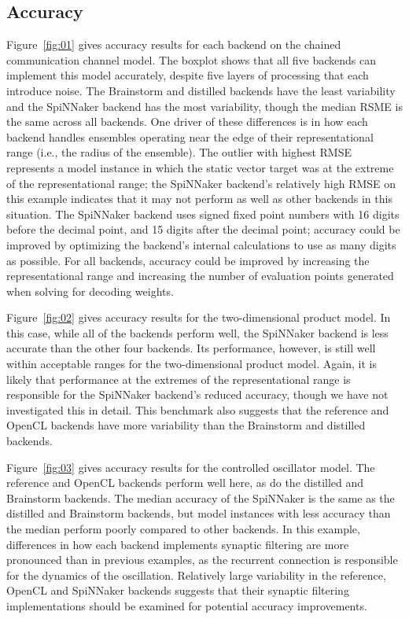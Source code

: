 \documentclass{frontiersSCNS}
\begin{document}
\subsection{Accuracy}

Figure~\ref{fig:01} gives accuracy results
for each backend on the chained communication channel model.
The boxplot shows that all five backends can
implement this model accurately,
despite five layers of processing
that each introduce noise.
The Brainstorm and distilled backends
have the least variability
and the SpiNNaker backend has the most variability,
though the median RSME is the same across all backends.
One driver of these differences
is in how each backend handles
ensembles operating near the edge
of their representational range
(i.e., the radius of the ensemble).
The outlier with highest RMSE represents
a model instance in which the static vector target
was at the extreme of the representational range;
the SpiNNaker backend's relatively high RMSE
on this example indicates that it
may not perform as well as other backends
in this situation.
The SpiNNaker backend uses
signed fixed point numbers
with 16 digits before the decimal point,
and 15 digits after the decimal point;
accuracy could be improved
by optimizing the backend's
internal calculations to use as
many digits as possible.
For all backends, accuracy could be improved
by increasing the representational range
and increasing the number of evaluation points generated
when solving for decoding weights.

Figure~\ref{fig:02} gives accuracy results
for the two-dimensional product model.
In this case, while all of the backends
perform well, the SpiNNaker backend
is less accurate than the other four backends.
Its performance, however, is still well within
acceptable ranges for the two-dimensional product model.
Again, it is likely that performance at the extremes
of the representational range
is responsible for the SpiNNaker backend's
reduced accuracy,
though we have not investigated this in detail.
This benchmark also suggests that
the reference and OpenCL backends
have more variability than the Brainstorm and distilled backends.

Figure~\ref{fig:03} gives accuracy results
for the controlled oscillator model.
The reference and OpenCL backends perform well here,
as do the distilled and Brainstorm backends.
The median accuracy of the SpiNNaker is
the same as the distilled and Brainstorm backends,
but model instances with less accuracy than the median
perform poorly compared to other backends.
In this example, differences in how each backend
implements synaptic filtering
are more pronounced than in previous examples,
as the recurrent connection is responsible
for the dynamics of the oscillation.
Relatively large variability in the
reference, OpenCL and SpiNNaker backends
suggests that their synaptic filtering implementations
should be examined for potential accuracy improvements.
\end{document}
